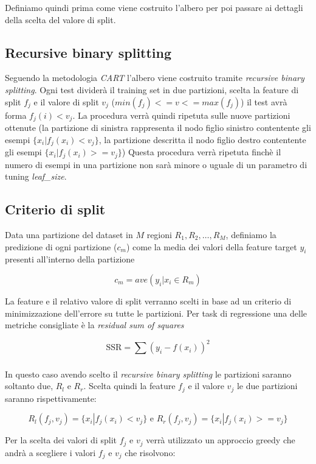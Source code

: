 \documentclass{article}
\begin{document}
    Definiamo quindi prima come viene costruito l'albero per poi passare ai dettagli 
    della scelta del valore di split.


    \subsection{Recursive binary splitting}
    Seguendo la metodologia
    \textit{CART} l'albero viene costruito tramite 
    \textit{recursive binary splitting}. Ogni test dividerà il training set in due 
    partizioni, scelta la feature di split $f_j$ 
    e il valore di split $v_j$ ($min(f_j) <= v <= max(f_j)$) il test avrà forma 
    $ f_j(i) < v_j$. La procedura verrà quindi ripetuta sulle nuove partizioni ottenute
    (la partizione di sinistra rappresenta il nodo figlio sinistro 
    contentente gli esempi  $\{x_i | f_j(x_i) < v_j\}$, la partizione descritta
    il nodo figlio destro contentente gli esempi  $\{x_i | f_j(x_i) >= v_j\}$)
    Questa procedura verrà ripetuta finchè il numero di esempi in una partizione non sarà 
    minore o uguale di un parametro di tuning \textit{leaf\_size}. 

    \subsection{Criterio di split}
    Data una partizione del dataset in $M$ regioni $R_1,R_2,\ldots,R_M$, definiamo 
    la predizione di ogni partizione ($c_m$) come la media dei valori della feature target 
    $y_i$ presenti all'interno della partizione

    \[
        c_m = ave(y_i|x_i \in R_m)  
    \]

    La feature e il relativo valore di split verranno scelti in base
    ad un criterio di minimizzazione dell'errore su tutte le partizioni.
    Per task di regressione una delle metriche consigliate è la \textit{residual sum of squares}

    \[
        \text{SSR}= \sum_{} (y_i - f(x_i))^2
    \]

    In questo caso avendo scelto il \textit{recursive binary splitting} le partizioni
    saranno soltanto due, $R_l$ e $R_r$. Scelta quindi la feature $f_j$
    e il valore $v_j$ le due partizioni saranno rispettivamente:

    \[
        R_l(f_j, v_j) = \{x_i | f_j(x_i) < v_j\}  \text{  e  } R_r(f_j, v_j) = \{x_i | f_j(x_i) >= v_j\}
    \]

    Per la scelta dei valori di split $f_j$ e $v_j$ verrà utilizzato un approccio
    greedy che andrà a scegliere i valori $f_j$ e $v_j$ che risolvono:
\end{document}
